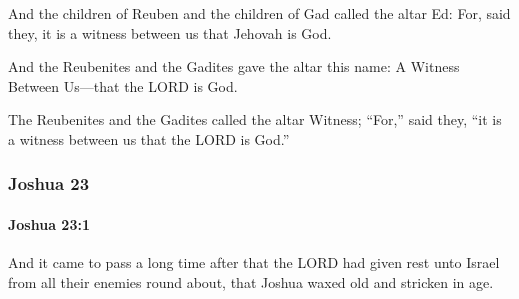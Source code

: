 			\begin{versebox}
					\item[BHS] 
					\item[ASV] And the children of Reuben and the children of Gad called the altar Ed: For, said they, it is a witness between us that Jehovah is God.
					\item[NIV] And the Reubenites and the Gadites gave the altar this name: A Witness Between Us—that the LORD is God.
					\item[NRSV] The Reubenites and the Gadites called the altar Witness; “For,” said they, “it is a witness between us that the LORD is God.”
			\end{versebox}
	\subsubsection{Joshua 23} %
		\label{JOSHUA-23}

		\paragraph{Joshua 23:1} %
			\label{JOSHUA-23-1}

			And it came to pass a long time after that the LORD had given rest unto Israel from all their enemies round about, that Joshua waxed old and stricken in age.

